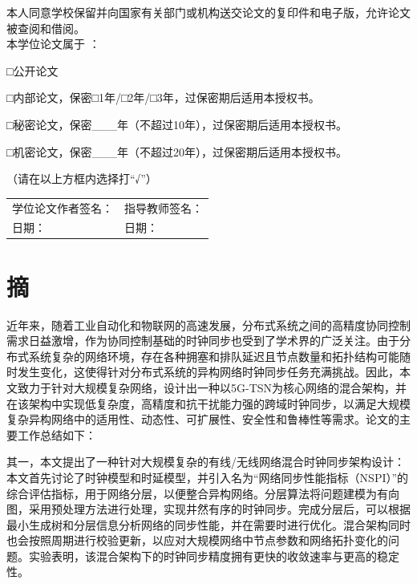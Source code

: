 \documentclass[UTF8,a4paper,12pt]{ctexart}
\numberwithin{equation}{section}
\begin{document}
本人同意学校保留并向国家有关部门或机构送交论文的复印件和电子版，允许论文被查阅和借阅。\\
本学位论文属于 ：\par
□公开论文\par
□内部论文，保密□1年/□2年/□3年，过保密期后适用本授权书。\par
□秘密论文，保密\_\_\_年（不超过10年），过保密期后适用本授权书。\par
□机密论文，保密\_\_\_年（不超过20年），过保密期后适用本授权书。\par
（请在以上方框内选择打“√”）\\

\begin{flushright}
\begin{tabular}{l l}
学位论文作者签名：\hspace{10mm}\qquad \hspace{100mm}&指导教师签名：\qquad\\
日期： &日期：\\
\end{tabular}
\end{flushright}

\newpage
{}

\section*{摘}


近年来，随着工业自动化和物联网的高速发展，分布式系统之间的高精度协同控制需求日益激增，作为协同控制基础的时钟同步也受到了学术界的广泛关注。由于分布式系统复杂的网络环境，存在各种拥塞和排队延迟且节点数量和拓扑结构可能随时发生变化，这使得针对分布式系统的异构网络时钟同步任务充满挑战。因此，本文致力于针对大规模复杂网络，设计出一种以5G-TSN为核心网络的混合架构，并在该架构中实现低复杂度，高精度和抗干扰能力强的跨域时钟同步，以满足大规模复杂异构网络中的适用性、动态性、可扩展性、安全性和鲁棒性等需求。论文的主要工作总结如下：

其一，本文提出了一种针对大规模复杂的有线/无线网络混合时钟同步架构设计：本文首先讨论了时钟模型和时延模型，并引入名为“网络同步性能指标（NSPI）”的综合评估指标，用于网络分层，以便整合异构网络。分层算法将问题建模为有向图，采用预处理方法进行处理，实现井然有序的时钟同步。完成分层后，可以根据最小生成树和分层信息分析网络的同步性能，并在需要时进行优化。混合架构同时也会按照周期进行校验更新，以应对大规模网络中节点参数和网络拓扑变化的问题。实验表明，该混合架构下的时钟同步精度拥有更快的收敛速率与更高的稳定性。
\end{document}
